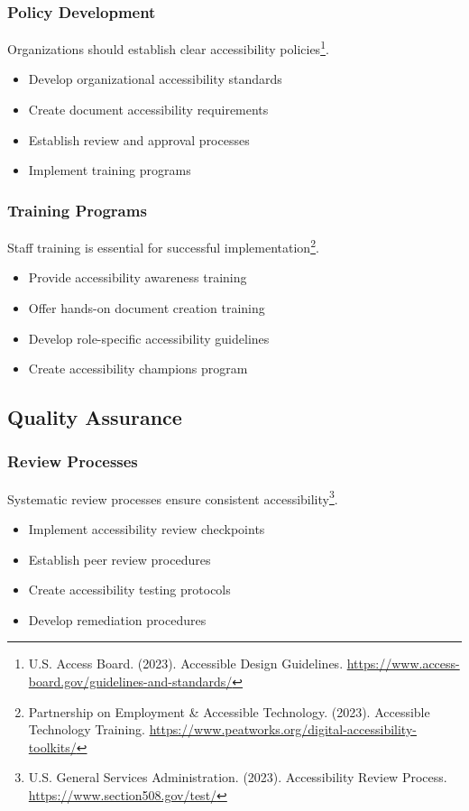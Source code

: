 \subsubsection{Policy Development}
Organizations should establish clear accessibility policies\footnote{U.S. Access Board. (2023). Accessible Design Guidelines. \url{https://www.access-board.gov/guidelines-and-standards/}}.

\begin{itemize}
\item Develop organizational accessibility standards
\item Create document accessibility requirements
\item Establish review and approval processes
\item Implement training programs
\end{itemize}

\subsubsection{Training Programs}
Staff training is essential for successful implementation\footnote{Partnership on Employment \& Accessible Technology. (2023). Accessible Technology Training. \url{https://www.peatworks.org/digital-accessibility-toolkits/}}.

\begin{itemize}
\item Provide accessibility awareness training
\item Offer hands-on document creation training
\item Develop role-specific accessibility guidelines
\item Create accessibility champions program
\end{itemize}

\subsection{Quality Assurance}

\subsubsection{Review Processes}
Systematic review processes ensure consistent accessibility\footnote{U.S. General Services Administration. (2023). Accessibility Review Process. \url{https://www.section508.gov/test/}}.

\begin{itemize}
\item Implement accessibility review checkpoints
\item Establish peer review procedures
\item Create accessibility testing protocols
\item Develop remediation procedures
\end{itemize}

